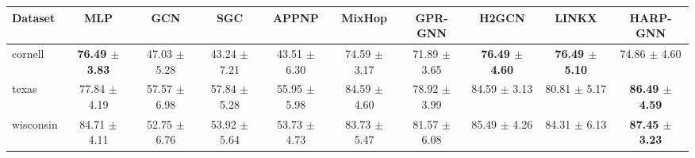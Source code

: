 \begin{tabular}{lccccccccc}
\toprule
Dataset & MLP & GCN & SGC & APPNP & MixHop & GPR-GNN & H2GCN & LINKX & HARP-GNN \\
\midrule
cornell & \textbf{76.49 $\pm$ 3.83} & 47.03 $\pm$ 5.28 & 43.24 $\pm$ 7.21 & 43.51 $\pm$ 6.30 & 74.59 $\pm$ 3.17 & 71.89 $\pm$ 3.65 & \textbf{76.49 $\pm$ 4.60} & \textbf{76.49 $\pm$ 5.10} & 74.86 $\pm$ 4.60 \\
texas & 77.84 $\pm$ 4.19 & 57.57 $\pm$ 6.98 & 57.84 $\pm$ 5.28 & 55.95 $\pm$ 5.98 & 84.59 $\pm$ 4.60 & 78.92 $\pm$ 3.99 & 84.59 $\pm$ 3.13 & 80.81 $\pm$ 5.17 & \textbf{86.49 $\pm$ 4.59} \\
wisconsin & 84.71 $\pm$ 4.11 & 52.75 $\pm$ 6.76 & 53.92 $\pm$ 5.64 & 53.73 $\pm$ 4.73 & 83.73 $\pm$ 5.47 & 81.57 $\pm$ 6.08 & 85.49 $\pm$ 4.26 & 84.31 $\pm$ 6.13 & \textbf{87.45 $\pm$ 3.23} \\
\bottomrule
\end{tabular}
